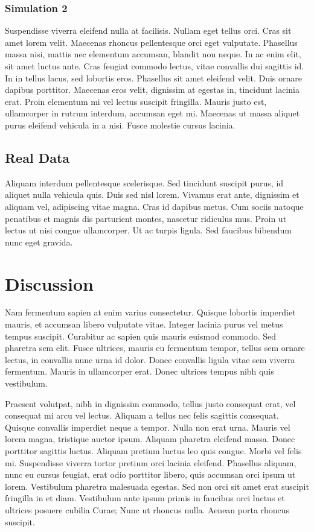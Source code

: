 \documentclass[draft,wrr]{AGUTeX}
\begin{document}
\begin{article}
\subsubsection{Simulation 2}

Suspendisse viverra eleifend nulla at facilisis. Nullam eget tellus orci. Cras sit amet lorem velit. Maecenas rhoncus pellentesque orci eget vulputate. Phasellus massa nisi, mattis nec elementum accumsan, blandit non neque. In ac enim elit, sit amet luctus ante. Cras feugiat commodo lectus, vitae convallis dui sagittis id. In in tellus lacus, sed lobortis eros. Phasellus sit amet eleifend velit. Duis ornare dapibus porttitor. Maecenas eros velit, dignissim at egestas in, tincidunt lacinia erat. Proin elementum mi vel lectus suscipit fringilla. Mauris justo est, ullamcorper in rutrum interdum, accumsan eget mi. Maecenas ut massa aliquet purus eleifend vehicula in a nisi. Fusce molestie cursus lacinia.

\subsection{Real Data}

Aliquam interdum pellentesque scelerisque. Sed tincidunt suscipit purus, id aliquet nulla vehicula quis. Duis sed nisl lorem. Vivamus erat ante, dignissim et aliquam vel, adipiscing vitae magna. Cras id dapibus metus. Cum sociis natoque penatibus et magnis dis parturient montes, nascetur ridiculus mus. Proin ut lectus ut nisi congue ullamcorper. Ut ac turpis ligula. Sed faucibus bibendum nunc eget gravida.


\section{Discussion}

Nam fermentum sapien at enim varius consectetur. Quisque lobortis imperdiet mauris, et accumsan libero vulputate vitae. Integer lacinia purus vel metus tempus suscipit. Curabitur ac sapien quis mauris euismod commodo. Sed pharetra sem elit. Fusce ultrices, mauris eu fermentum tempor, tellus sem ornare lectus, in convallis nunc urna id dolor. Donec convallis ligula vitae sem viverra fermentum. Mauris in ullamcorper erat. Donec ultrices tempus nibh quis vestibulum.

Praesent volutpat, nibh in dignissim commodo, tellus justo consequat erat, vel consequat mi arcu vel lectus. Aliquam a tellus nec felis sagittis consequat. Quisque convallis imperdiet neque a tempor. Nulla non erat urna. Mauris vel lorem magna, tristique auctor ipsum. Aliquam pharetra eleifend massa. Donec porttitor sagittis luctus. Aliquam pretium luctus leo quis congue. Morbi vel felis mi. Suspendisse viverra tortor pretium orci lacinia eleifend. Phasellus aliquam, nunc eu cursus feugiat, erat odio porttitor libero, quis accumsan orci ipsum ut lorem. Vestibulum pharetra malesuada egestas. Sed non orci sit amet erat suscipit fringilla in et diam. Vestibulum ante ipsum primis in faucibus orci luctus et ultrices posuere cubilia Curae; Nunc ut rhoncus nulla. Aenean porta rhoncus suscipit.


\end{article}
\end{document}
